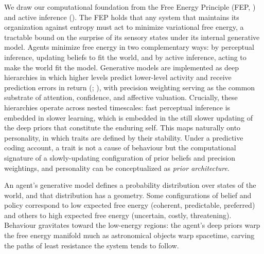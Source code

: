 \documentclass[
  jou,
  floatsintext,
  longtable,
  nolmodern,
  notxfonts,
  notimes,
  12pt,
  colorlinks=true,linkcolor=blue,citecolor=blue,urlcolor=blue]{apa7}
\begin{document}
We draw our computational foundation from the Free Energy Principle
(FEP, ) and active
inference (). The FEP holds that any system that maintains its organization
against entropy must act to minimize variational free energy, a
tractable bound on the surprise of its sensory states under its internal
generative model. Agents minimize free energy in two complementary ways:
by perceptual inference, updating beliefs to fit the world, and by
active inference, acting to make the world fit the model. Generative
models are implemented as deep hierarchies in which higher levels
predict lower-level activity and receive prediction errors in return
(;
), with precision
weighting serving as the common substrate of attention, confidence, and
affective valuation. Crucially, these hierarchies operate across nested
timescales: fast perceptual inference is embedded in slower learning,
which is embedded in the still slower updating of the deep priors that
constitute the enduring self. This maps naturally onto personality, in
which traits are defined by their stability. Under a predictive coding
account, a trait is not a cause of behaviour but the computational
signature of a slowly-updating configuration of prior beliefs and
precision weightings, and personality can be conceptualized as
\emph{prior architecture}.

An agent's generative model defines a probability distribution over
states of the world, and that distribution has a geometry. Some
configurations of belief and policy correspond to low expected free
energy (coherent, predictable, preferred) and others to high expected
free energy (uncertain, costly, threatening). Behaviour gravitates
toward the low-energy regions: the agent's deep priors warp the free
energy manifold much as astronomical objects warp spacetime, carving the
paths of least resistance the system tends to follow.
\end{document}
